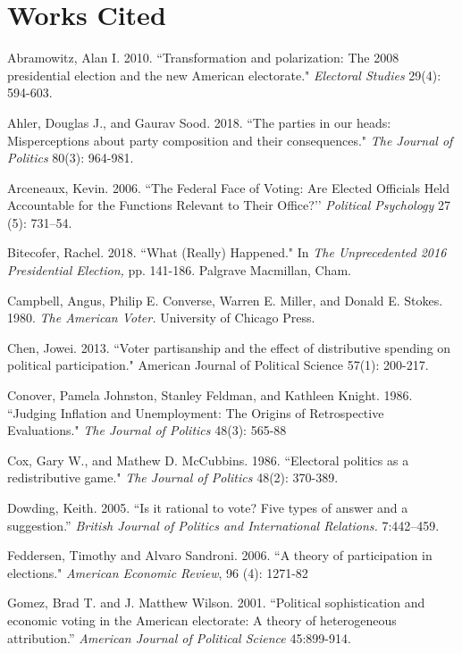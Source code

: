 \documentclass[12pt]{paper}
\begin{document}
\section*{Works Cited}
\singlespace 
\begin{hangparas}{.25in}{1}

Abramowitz, Alan I. 2010. ``Transformation and polarization: The 2008 presidential election and the new American electorate." \textit{Electoral Studies} 29(4): 594-603.

Ahler, Douglas J., and Gaurav Sood. 2018. ``The parties in our heads: Misperceptions about party composition and their consequences." \textit{The Journal of Politics} 80(3): 964-981.

Arceneaux, Kevin. 2006. ``The Federal Face of Voting: Are Elected Officials Held Accountable for the Functions Relevant to Their Office?’’ \textit{Political Psychology} 27 (5): 731–54.

Bitecofer, Rachel. 2018. ``What (Really) Happened." In \textit{The Unprecedented 2016 Presidential Election,} pp. 141-186. Palgrave Macmillan, Cham.

Campbell, Angus, Philip E. Converse, Warren E. Miller, and Donald E. Stokes. 1980. \textit{The American Voter.} University of Chicago Press.

Chen, Jowei. 2013. ``Voter partisanship and the effect of distributive spending on political participation." American Journal of Political Science 57(1): 200-217.

Conover, Pamela Johnston, Stanley Feldman, and Kathleen Knight. 1986. ``Judging Inflation and Unemployment: The Origins of Retrospective Evaluations." \textit{The Journal of Politics} 48(3): 565-88

Cox, Gary W., and Mathew D. McCubbins. 1986. ``Electoral politics as a redistributive game." \textit{The Journal of Politics} 48(2): 370-389.

Dowding, Keith. 2005. ``Is it rational to vote? Five types of answer and a suggestion.” \textit{British Journal of Politics and International Relations.} 7:442–459.

Feddersen, Timothy and Alvaro Sandroni. 2006. ``A theory of participation in elections." \textit{American Economic Review}, 96 (4): 1271-82

Gomez, Brad T. and J. Matthew Wilson. 2001. ``Political sophistication and economic voting in the American electorate: A theory of heterogeneous attribution.” \textit{American Journal of Political Science} 45:899-914.


\end{hangparas}
\end{document}
